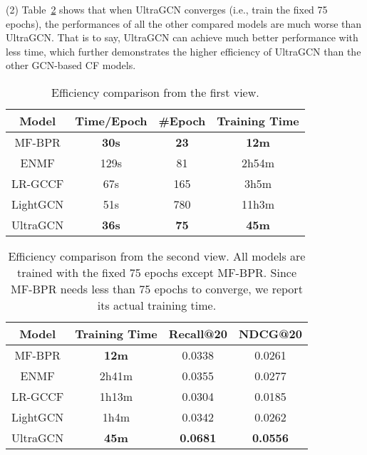 \documentclass[sigconf,authorversion]{acmart}
\begin{document}
(2) Table~\ref{exp_efficiency_2} shows that when UltraGCN converges (i.e., train the fixed 75 epochs), the performances of all the other compared models are much worse than UltraGCN. That is to say, UltraGCN can achieve much better performance with less time, which further demonstrates the higher efficiency of UltraGCN than the other GCN-based CF models.  

\begin{table}[!t]
\centering
\caption{Efficiency comparison from the first view.}
\begin{tabular}{c|c|c|c}
\toprule
Model    & Time/Epoch & \#Epoch & Training Time \\ \midrule
MF-BPR   & \textbf{30s}        & \textbf{23}      & \textbf{12m}           \\
ENMF     & 129s       & 81     & 2h54m          \\
LR-GCCF  & 67s        & 165     & 3h5m          \\
LightGCN & 51s        & 780     & 11h3m        \\
\hline
UltraGCN & \textbf{36s}        & \textbf{75}      & \textbf{	45m}           \\ \bottomrule
\end{tabular}
\label{exp_efficiency_1}
\end{table}

\begin{table}[!t]
\caption{Efficiency comparison from the second view. All models are trained with the fixed 75 epochs except MF-BPR. Since MF-BPR needs less than 75 epochs to converge, we report its actual training time.}
\begin{tabular}{c|c|c|c}
\toprule
Model    & Training Time & Recall@20       & NDCG@20         \\ \midrule
MF-BPR   & \textbf{12m}  & 0.0338          & 0.0261          \\
ENMF     & 2h41m         & 0.0355          & 0.0277          \\
LR-GCCF  & 1h13m         &  0.0304         & 0.0185                 \\
LightGCN & 1h4m          & 0.0342          & 0.0262          \\ \hline
UltraGCN & \textbf{45m}  & \textbf{0.0681} & \textbf{0.0556} \\ \bottomrule
\end{tabular}
\label{exp_efficiency_2}
\end{table}
\end{document}
